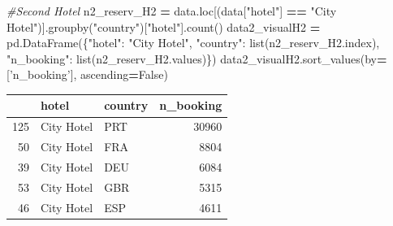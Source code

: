 \documentclass[10pt,a4paper]{article}
\newenvironment{Shaded}{\begin{snugshade}}{\end{snugshade}}
\newcommand{\BuiltInTok}[1]{#1}
\newcommand{\CommentTok}[1]{\textcolor[rgb]{0.56,0.35,0.01}{\textit{#1}}}
\newcommand{\NormalTok}[1]{#1}
\newcommand{\OperatorTok}[1]{\textcolor[rgb]{0.81,0.36,0.00}{\textbf{#1}}}
\newcommand{\StringTok}[1]{\textcolor[rgb]{0.31,0.60,0.02}{#1}}
\newcommand{\VariableTok}[1]{\textcolor[rgb]{0.00,0.00,0.00}{#1}}
\theoremstyle{break}
\begin{document}
\begin{Shaded}
\begin{Highlighting}[]
\CommentTok{#Second Hotel}
\NormalTok{n2_reserv_H2 }\OperatorTok{=}\NormalTok{ data.loc[(data[}\StringTok{"hotel"}\NormalTok{] }\OperatorTok{==} \StringTok{"City Hotel"}\NormalTok{)].groupby(}\StringTok{"country"}\NormalTok{)[}\StringTok{"hotel"}\NormalTok{].count()}
\NormalTok{data2_visualH2 }\OperatorTok{=}\NormalTok{ pd.DataFrame(\{}\StringTok{"hotel"}\NormalTok{: }\StringTok{"City Hotel"}\NormalTok{,}
                                \StringTok{"country"}\NormalTok{: }\BuiltInTok{list}\NormalTok{(n2_reserv_H2.index),}
                                \StringTok{"n_booking"}\NormalTok{: }\BuiltInTok{list}\NormalTok{(n2_reserv_H2.values)\})}
\NormalTok{data2_visualH2.sort_values(by}\OperatorTok{=}\NormalTok{[}\StringTok{'n_booking'}\NormalTok{], ascending}\OperatorTok{=}\VariableTok{False}\NormalTok{)}
\end{Highlighting}
\end{Shaded}

\begin{longtable}[]{@{}rllr@{}}
\toprule
& hotel & country & n\_booking\tabularnewline
\midrule
\endhead
125 & City Hotel & PRT & 30960\tabularnewline
50 & City Hotel & FRA & 8804\tabularnewline
39 & City Hotel & DEU & 6084\tabularnewline
53 & City Hotel & GBR & 5315\tabularnewline
46 & City Hotel & ESP & 4611\tabularnewline
\bottomrule
\end{longtable}
\end{document}
